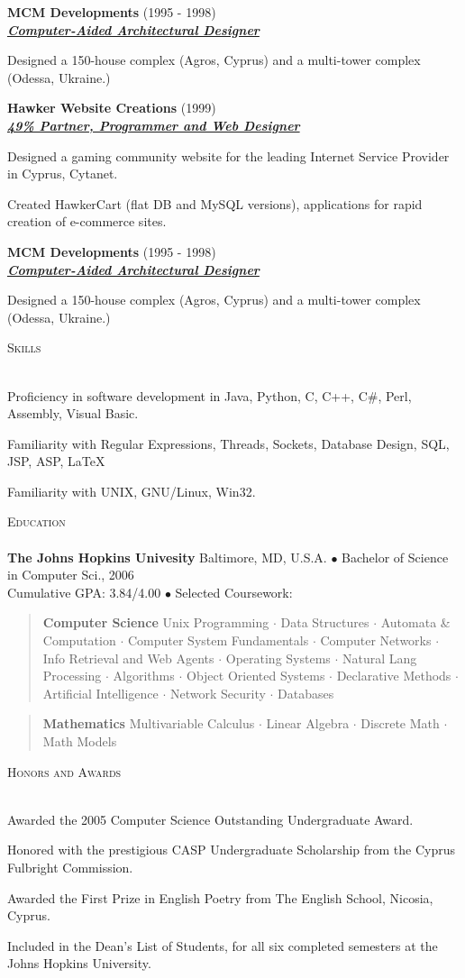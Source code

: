 \documentclass{article}
\newcommand{\area}[2]{\vspace*{-9pt} \begin{verse}\textbf{#1}   #2 \end{verse}  }
\newcommand{\lineunder}{\vspace*{-8pt} \\ \hspace*{-18pt} \hrulefill \\}
\newcommand{\header}[1]{{\hspace*{-15pt}\vspace*{6pt} \textsc{#1}} \vspace*{-6pt} \lineunder}
\newcommand{\employer}[3]{{ \textbf{#1} (#2)\\ \underline{\textbf{\emph{#3}}}\\  }}
\newenvironment{achievements}{\begin{list}{\topsep 0pt \itemsep -2pt}} {\vspace*{4pt}\end{list}}
\newcommand{\schoolwithcourses}[4]{
 \textbf{#1} #2 $\bullet$ #3\\ 
#4 $\bullet$  Selected Coursework:\\
\vspace*{5pt}
}
\begin{document}
\employer{MCM Developments}{1995 - 1998}{Computer-Aided Architectural Designer}
	\begin{achievements}
	\item Designed a 150-house complex (Agros, Cyprus) and a multi-tower complex (Odessa, Ukraine.)
	\end{achievements}

\employer{Hawker Website Creations}{1999}{49\% Partner, Programmer and Web Designer}
	\begin{achievements}
	\item Designed a gaming community website for the leading Internet Service Provider in Cyprus, Cytanet.
	\item Created HawkerCart (flat DB and MySQL versions), applications for rapid creation of e-commerce sites.
	\end{achievements}
\employer{MCM Developments}{1995 - 1998}{Computer-Aided Architectural Designer}
	\begin{achievements}
	\item Designed a 150-house complex (Agros, Cyprus) and a multi-tower complex (Odessa, Ukraine.)
	\end{achievements}

\header{Skills}
\begin{achievements}
\item Proficiency in software development in Java, Python, C, C++, C\#, Perl, Assembly, Visual Basic.
\item Familiarity with Regular Expressions, Threads, Sockets, Database Design, SQL, JSP, ASP, \LaTeX
\item Familiarity with UNIX, GNU/Linux, Win32.
\end{achievements}

\header{Education}

\schoolwithcourses{The Johns Hopkins Univesity}{Baltimore, MD, U.S.A.}{Bachelor of Science in Computer Sci., 2006}
{Cumulative GPA: 3.84/4.00}
	\area{Computer Science}{ Unix Programming $\cdot$ Data Structures $\cdot$ Automata \& Computation $\cdot$ Computer System
Fundamentals $\cdot$ Computer Networks $\cdot$ Info Retrieval and Web Agents $\cdot$ Operating Systems $\cdot$
Natural Lang Processing $\cdot$ Algorithms $\cdot$ Object Oriented Systems $\cdot$ Declarative Methods $\cdot$
Artificial Intelligence $\cdot$ Network Security $\cdot$ Databases}
	\area{Mathematics}{Multivariable Calculus $\cdot$ Linear Algebra $\cdot$ Discrete Math $\cdot$ Math Models}

\header{Honors and Awards}
\begin{achievements}
\item  Awarded the 2005 Computer Science Outstanding Undergraduate Award.
\item Honored with the prestigious CASP Undergraduate Scholarship from the Cyprus Fulbright Commission.
\item  Awarded the First Prize in English Poetry from The English School, Nicosia, Cyprus.
\item Included in the Dean's List of Students, for all six completed semesters at the Johns Hopkins University.
\end{achievements}
\end{document}
